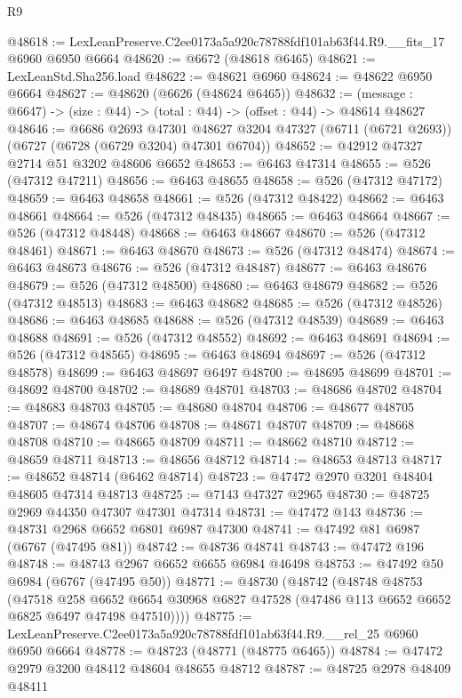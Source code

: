 \begin{lexlean}{R9}
\begin{coremodule}
@48618 := LexLeanPreserve.C2ee0173a5a920c78788fdf101ab63f44.R9.__fits_17 @6960 @6950 @6664
@48620 := @6672 (@48618 @6465)
@48621 := LexLeanStd.Sha256.load
@48622 := @48621 @6960
@48624 := @48622 @6950 @6664
@48627 := @48620 (@6626 (@48624 @6465))
@48632 := (message : @6647) -> (size : @44) -> (total : @44) -> (offset : @44) -> @48614 @48627
@48646 := @6686
    @2693
    @47301
    @48627
    @3204
    @47327
    (@6711 (@6721 @2693))
    (@6727 (@6728 (@6729 @3204) @47301 @6704))
@48652 := @42912 @47327 @2714 @51 @3202 @48606 @6652
@48653 := @6463 @47314
@48655 := @526 (@47312 @47211)
@48656 := @6463 @48655
@48658 := @526 (@47312 @47172)
@48659 := @6463 @48658
@48661 := @526 (@47312 @48422)
@48662 := @6463 @48661
@48664 := @526 (@47312 @48435)
@48665 := @6463 @48664
@48667 := @526 (@47312 @48448)
@48668 := @6463 @48667
@48670 := @526 (@47312 @48461)
@48671 := @6463 @48670
@48673 := @526 (@47312 @48474)
@48674 := @6463 @48673
@48676 := @526 (@47312 @48487)
@48677 := @6463 @48676
@48679 := @526 (@47312 @48500)
@48680 := @6463 @48679
@48682 := @526 (@47312 @48513)
@48683 := @6463 @48682
@48685 := @526 (@47312 @48526)
@48686 := @6463 @48685
@48688 := @526 (@47312 @48539)
@48689 := @6463 @48688
@48691 := @526 (@47312 @48552)
@48692 := @6463 @48691
@48694 := @526 (@47312 @48565)
@48695 := @6463 @48694
@48697 := @526 (@47312 @48578)
@48699 := @6463 @48697 @6497
@48700 := @48695 @48699
@48701 := @48692 @48700
@48702 := @48689 @48701
@48703 := @48686 @48702
@48704 := @48683 @48703
@48705 := @48680 @48704
@48706 := @48677 @48705
@48707 := @48674 @48706
@48708 := @48671 @48707
@48709 := @48668 @48708
@48710 := @48665 @48709
@48711 := @48662 @48710
@48712 := @48659 @48711
@48713 := @48656 @48712
@48714 := @48653 @48713
@48717 := @48652 @48714 (@6462 @48714)
@48723 := @47472 @2970 @3201 @48404 @48605 @47314 @48713
@48725 := @7143 @47327 @2965
@48730 := @48725 @2969 @44350 @47307 @47301 @47314
@48731 := @47472 @143
@48736 := @48731 @2968 @6652 @6801 @6987 @47300
@48741 := @47492 @81 @6987 (@6767 (@47495 @81))
@48742 := @48736 @48741
@48743 := @47472 @196
@48748 := @48743 @2967 @6652 @6655 @6984 @46498
@48753 := @47492 @50 @6984 (@6767 (@47495 @50))
@48771 := @48730
    (@48742
      (@48748
        @48753
        (@47518
          @258
          @6652
          @6654
          @30968
          @6827
          @47528
          (@47486 @113 @6652 @6652 @6825 @6497 @47498 @47510))))
@48775 := LexLeanPreserve.C2ee0173a5a920c78788fdf101ab63f44.R9.__rel_25 @6960 @6950 @6664
@48778 := @48723 (@48771 (@48775 @6465))
@48784 := @47472 @2979 @3200 @48412 @48604 @48655 @48712
@48787 := @48725 @2978 @48409 @48411

\end{coremodule}
\end{lexlean}
